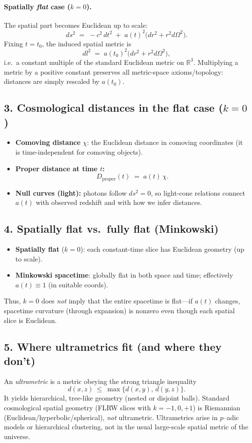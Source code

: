 \documentclass[12pt,a4paper]{article}
\begin{document}
\paragraph{Spatially \emph{flat} case ($k=0$).}
The spatial part becomes Euclidean up to scale:
\[
ds^2 \;=\; -c^2\,dt^2 \;+\; a(t)^2\big(dr^2 + r^2 d\Omega^2\big).
\]
Fixing $t=t_0$, the induced spatial metric is
\[
dl^2 \;=\; a(t_0)^2\big(dr^2 + r^2 d\Omega^2\big),
\]
i.e.\ a constant multiple of the standard Euclidean metric on $\mathbb{R}^3$.
Multiplying a metric by a positive constant preserves all metric-space axioms/topology:
distances are simply rescaled by $a(t_0)$.

\subsection*{3. Cosmological distances in the flat case ($k=0$)}
\begin{itemize}
\item \textbf{Comoving distance} $\chi$: the Euclidean distance in comoving coordinates
(it is time-independent for comoving objects).
\item \textbf{Proper distance at time $t$:}
\[
D_{\text{proper}}(t) \;=\; a(t)\,\chi.
\]
\item \textbf{Null curves (light):} photons follow $ds^2=0$, so light-cone relations connect $a(t)$
with observed redshift and with how we infer distances.
\end{itemize}

\subsection*{4. Spatially flat vs.\ fully flat (Minkowski)}
\begin{itemize}
\item \textbf{Spatially flat} ($k=0$): each constant-time slice has Euclidean geometry (up to scale).
\item \textbf{Minkowski spacetime}: globally flat in both space and time; effectively $a(t)\equiv 1$ (in suitable coords).
\end{itemize}
Thus, $k=0$ does \emph{not} imply that the entire spacetime is flat—if $a(t)$ changes, spacetime curvature
(through expansion) is nonzero even though each spatial slice is Euclidean.

\subsection*{5. Where ultrametrics fit (and where they don’t)}
An \emph{ultrametric} is a metric obeying the strong triangle inequality
\[
d(x,z)\ \le\ \max\{d(x,y),\,d(y,z)\}.
\]
It yields hierarchical, tree-like geometry (nested or disjoint balls). Standard cosmological spatial geometry
(FLRW slices with $k=-1,0,+1$) is Riemannian (Euclidean/hyperbolic/spherical), \emph{not} ultrametric.
Ultrametrics arise in $p$--adic models or hierarchical clustering, not in the usual large-scale spatial
metric of the universe.
\end{document}
